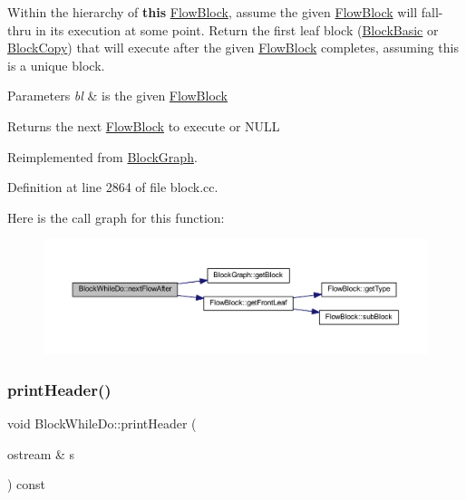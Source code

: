 Within the hierarchy of {\bfseries{this}} \mbox{\hyperlink{class_flow_block}{Flow\+Block}}, assume the given \mbox{\hyperlink{class_flow_block}{Flow\+Block}} will fall-\/thru in its execution at some point. Return the first leaf block (\mbox{\hyperlink{class_block_basic}{Block\+Basic}} or \mbox{\hyperlink{class_block_copy}{Block\+Copy}}) that will execute after the given \mbox{\hyperlink{class_flow_block}{Flow\+Block}} completes, assuming this is a unique block. 
\begin{DoxyParams}{Parameters}
{\em bl} & is the given \mbox{\hyperlink{class_flow_block}{Flow\+Block}} \\
\hline
\end{DoxyParams}
\begin{DoxyReturn}{Returns}
the next \mbox{\hyperlink{class_flow_block}{Flow\+Block}} to execute or N\+U\+LL 
\end{DoxyReturn}


Reimplemented from \mbox{\hyperlink{class_block_graph_aba0d42cf572bdcf2bca44d22fad971f6}{Block\+Graph}}.



Definition at line 2864 of file block.\+cc.

Here is the call graph for this function\+:
\nopagebreak
\begin{figure}[H]
\begin{center}
\leavevmode
\includegraphics[width=350pt]{class_block_while_do_a28f4f91e7ec3b4cc2bde0a0d432e0fe8_cgraph}
\end{center}
\end{figure}
\mbox{\label{class_block_while_do_a298687d8d9dbe264f779cca2c89ca32e}} 
\subsubsection{\texorpdfstring{printHeader()}{printHeader()}}
{\footnotesize\ttfamily void Block\+While\+Do\+::print\+Header (\begin{DoxyParamCaption}\item[{ostream \&}]{s }\end{DoxyParamCaption}) const\hspace{0.3cm}{\ttfamily [virtual]}}



